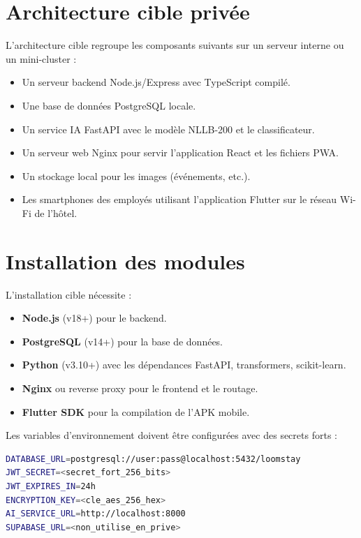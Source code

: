 \section{Architecture cible privée}
L'architecture cible regroupe les composants suivants sur un serveur interne ou un mini-cluster :
\begin{itemize}
    \item Un serveur backend Node.js/Express avec TypeScript compilé.
    \item Une base de données PostgreSQL locale.
    \item Un service IA FastAPI avec le modèle NLLB-200 et le classificateur.
    \item Un serveur web Nginx pour servir l'application React et les fichiers PWA.
    \item Un stockage local pour les images (événements, etc.).
    \item Les smartphones des employés utilisant l'application Flutter sur le réseau Wi-Fi de l'hôtel.
\end{itemize}


\section{Installation des modules}
L'installation cible nécessite :
\begin{itemize}
    \item \textbf{Node.js} (v18+) pour le backend.
    \item \textbf{PostgreSQL} (v14+) pour la base de données.
    \item \textbf{Python} (v3.10+) avec les dépendances FastAPI, transformers, scikit-learn.
    \item \textbf{Nginx} ou reverse proxy pour le frontend et le routage.
    \item \textbf{Flutter SDK} pour la compilation de l'APK mobile.
\end{itemize}

Les variables d'environnement doivent être configurées avec des secrets forts :
\begin{lstlisting}[language=bash,caption={Variables d'environnement critiques}]
DATABASE_URL=postgresql://user:pass@localhost:5432/loomstay
JWT_SECRET=<secret_fort_256_bits>
JWT_EXPIRES_IN=24h
ENCRYPTION_KEY=<cle_aes_256_hex>
AI_SERVICE_URL=http://localhost:8000
SUPABASE_URL=<non_utilise_en_prive>
\end{lstlisting}


